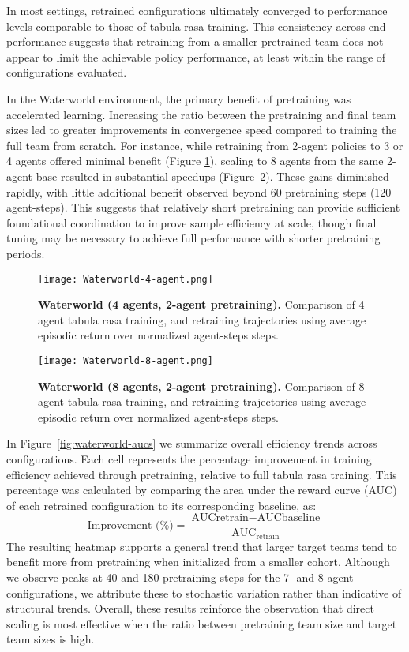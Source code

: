 In most settings, retrained configurations ultimately converged to 
performance levels comparable to those of tabula rasa training.
This consistency across end performance suggests that retraining from a smaller 
pretrained team does not appear to limit the achievable policy performance, 
at least within the range of configurations evaluated.

In the Waterworld environment, the primary benefit of pretraining was accelerated learning. 
Increasing the ratio between the pretraining and final team sizes led to greater improvements 
in convergence speed compared to training the full team from scratch. For instance, 
while retraining from 2-agent policies to 3 or 4 agents offered minimal benefit 
(Figure \ref{fig:waterworld-4}), scaling to 8 agents from the same 2-agent base resulted in 
substantial speedups (Figure~\ref{fig:waterworld-8}). These gains diminished rapidly, 
with little additional benefit observed beyond 60 pretraining steps (120 agent-steps).
This suggests that relatively short pretraining can provide sufficient foundational 
coordination to improve sample efficiency at scale, though final tuning may 
be necessary to achieve full performance with shorter pretraining periods.

\begin{figure}[!ht]
    \centering
    \texttt{[image: Waterworld-4-agent.png]}
    \caption{\textbf{Waterworld (4 agents, 2-agent pretraining).} Comparison of 
    4 agent tabula rasa training, and retraining trajectories using average 
    episodic return over normalized agent-steps steps.}
    \label{fig:waterworld-4}
\end{figure}

\begin{figure}[!ht]
    \centering
    \texttt{[image: Waterworld-8-agent.png]}
    \caption{\textbf{Waterworld (8 agents, 2-agent pretraining).} Comparison of 
    8 agent tabula rasa training, and retraining trajectories using average 
    episodic return over normalized agent-steps steps.}
    \label{fig:waterworld-8}
\end{figure}

In Figure~\ref{fig:waterworld-aucs} we summarize overall efficiency trends across configurations. 
Each cell represents the percentage improvement in training efficiency 
achieved through pretraining, relative to full tabula rasa training.
This percentage was calculated by comparing the area under the reward curve 
(AUC) of each retrained configuration to its corresponding baseline, as:
\[
    \text{Improvement (\%)} 
    = \frac{\text{AUC}{\text{retrain}} - \text{AUC}{\text{baseline}}}{\text{AUC}_{\text{retrain}}}
\]
The resulting heatmap supports a general trend that larger target teams tend to 
benefit more from pretraining when initialized from a smaller cohort.
Although we observe peaks at 40 and 180 pretraining steps for the 7- and 8-agent configurations, 
we attribute these to stochastic variation rather than indicative of structural trends.
Overall, these results reinforce the observation that direct scaling is most effective 
when the ratio between pretraining team size and target team sizes is high.

